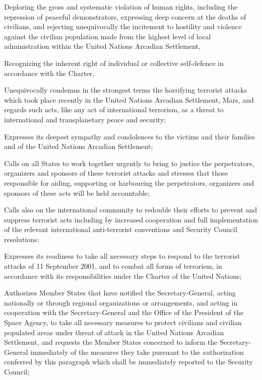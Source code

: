 Deploring the gross and systematic violation of human rights, including the repression of peaceful demonstrators, expressing deep concern at the deaths of civilians, and rejecting unequivocally the incitement to hostility and violence against the civilian population made from the highest level of local administration within the United Nations Arcadian Settlement,

Recognizing the inherent right of individual or collective self-defence in accordance with the Charter,

\startitemize[n]
\setupwhitespace[big]
\item Unequivocally condemns in the strongest terms the horrifying terrorist attacks which took place recently in the United Nations Arcadian Settlement, Mars, and regards such acts, like any act of international terrorism, as a threat to international and transplanetary peace and security;

\item Expresses its deepest sympathy and condolences to the victims and their families and of the United Nations Arcadian Settlement;

\item Calls on all States to work together urgently to bring to justice the perpetrators, organizers and sponsors of these terrorist attacks and stresses that those responsible for aiding, supporting or harbouring the perpetrators, organizers and sponsors of these acts will be held accountable;

\item Calls also on the international community to redouble their efforts to prevent and suppress terrorist acts including by increased cooperation and full implementation of the relevant international anti-terrorist conventions and Security Council resolutions;

\item Expresses its readiness to take all necessary steps to respond to the terrorist attacks of 11 September 2001, and to combat all forms of terrorism, in accordance with its responsibilities under the Charter of the United Nations;

\item Authorizes Member States that have notified the Secretary-General, acting nationally or through regional organizations or arrangements, and acting in cooperation with the Secretary-General and the Office of the President of the Space Agency, to take all necessary measures to protect civilians and civilian populated areas under threat of attack in the United Nations Arcadian Settlement, and requests the Member States concerned to inform the Secretary-General immediately of the measures they take pursuant to the authorization conferred by this paragraph which shall be immediately reported to the Security Council;

